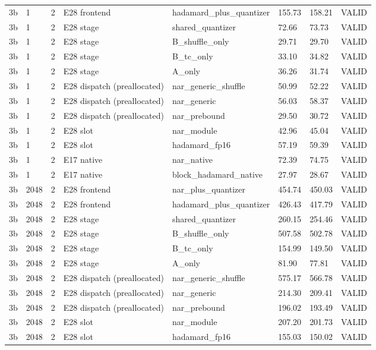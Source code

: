 {\begin{longtable}{llllllll}
3b & 1 & 2 & E28 frontend & hadamard\_plus\_quantizer & 155.73 & 158.21 & VALID \\
3b & 1 & 2 & E28 stage & shared\_quantizer & 72.66 & 73.73 & VALID \\
3b & 1 & 2 & E28 stage & B\_shuffle\_only & 29.71 & 29.70 & VALID \\
3b & 1 & 2 & E28 stage & B\_tc\_only & 33.10 & 34.82 & VALID \\
3b & 1 & 2 & E28 stage & A\_only & 36.26 & 31.74 & VALID \\
3b & 1 & 2 & E28 dispatch (preallocated) & nar\_generic\_shuffle & 50.99 & 52.22 & VALID \\
3b & 1 & 2 & E28 dispatch (preallocated) & nar\_generic & 56.03 & 58.37 & VALID \\
3b & 1 & 2 & E28 dispatch (preallocated) & nar\_prebound & 29.50 & 30.72 & VALID \\
3b & 1 & 2 & E28 slot & nar\_module & 42.96 & 45.04 & VALID \\
3b & 1 & 2 & E28 slot & hadamard\_fp16 & 57.19 & 59.39 & VALID \\
3b & 1 & 2 & E17 native & nar\_native & 72.39 & 74.75 & VALID \\
3b & 1 & 2 & E17 native & block\_hadamard\_native & 27.97 & 28.67 & VALID \\
3b & 2048 & 2 & E28 frontend & nar\_plus\_quantizer & 454.74 & 450.03 & VALID \\
3b & 2048 & 2 & E28 frontend & hadamard\_plus\_quantizer & 426.43 & 417.79 & VALID \\
3b & 2048 & 2 & E28 stage & shared\_quantizer & 260.15 & 254.46 & VALID \\
3b & 2048 & 2 & E28 stage & B\_shuffle\_only & 507.58 & 502.78 & VALID \\
3b & 2048 & 2 & E28 stage & B\_tc\_only & 154.99 & 149.50 & VALID \\
3b & 2048 & 2 & E28 stage & A\_only & 81.90 & 77.81 & VALID \\
3b & 2048 & 2 & E28 dispatch (preallocated) & nar\_generic\_shuffle & 575.17 & 566.78 & VALID \\
3b & 2048 & 2 & E28 dispatch (preallocated) & nar\_generic & 214.30 & 209.41 & VALID \\
3b & 2048 & 2 & E28 dispatch (preallocated) & nar\_prebound & 196.02 & 193.49 & VALID \\
3b & 2048 & 2 & E28 slot & nar\_module & 207.20 & 201.73 & VALID \\
3b & 2048 & 2 & E28 slot & hadamard\_fp16 & 155.03 & 150.02 & VALID \\

\end{longtable}}
